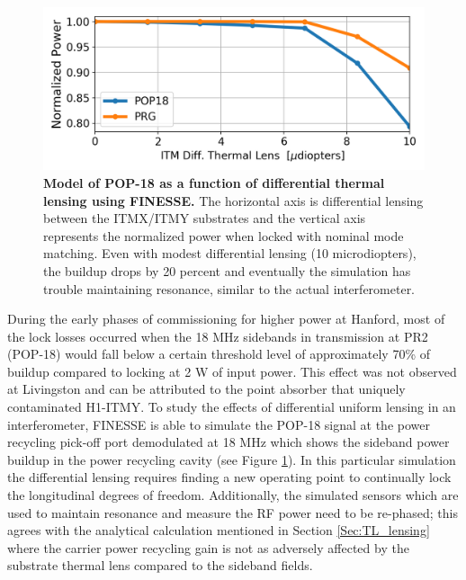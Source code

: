 	\begin{figure}[t!]
	\centering
	\includegraphics[width=0.75 \textwidth]{../Figures/POP_18dive.png}
	\caption[Model of POP-18 as a function of differential thermal lensing using FINESSE.]  
	{\textbf{Model of POP-18 as a function of differential thermal lensing using FINESSE.}
		The horizontal axis is differential lensing between the ITMX/ITMY substrates and the vertical axis represents the normalized power when locked with nominal mode matching.  Even with modest differential lensing (10 microdiopters), the buildup drops by 20 percent and eventually the simulation has trouble maintaining resonance, similar to the actual interferometer.
	}
	\label{fig:POP18}
	\end{figure}

	During the early phases of commissioning for higher power at Hanford, most of the lock losses occurred when the 18 MHz sidebands in transmission at PR2 (POP-18) would fall below a certain threshold level of approximately 70\% of buildup compared to locking at 2 W of input power.  This effect was not observed at Livingston and can be attributed to the point absorber that uniquely contaminated H1-ITMY.  To study the effects of differential uniform lensing in an interferometer, FINESSE is able to simulate the POP-18 signal at the power recycling pick-off port demodulated at 18 MHz which shows the sideband power buildup in the power recycling cavity (see Figure \ref{fig:POP18}). In this particular simulation the differential lensing requires finding a new operating point to continually lock the longitudinal degrees of freedom.  Additionally, the simulated sensors which are used to maintain resonance and measure the RF power need to be re-phased; this agrees with the analytical calculation mentioned in Section \ref{Sec:TL_lensing} where the carrier power recycling gain is not as adversely affected by the substrate thermal lens compared to the sideband fields.
	
